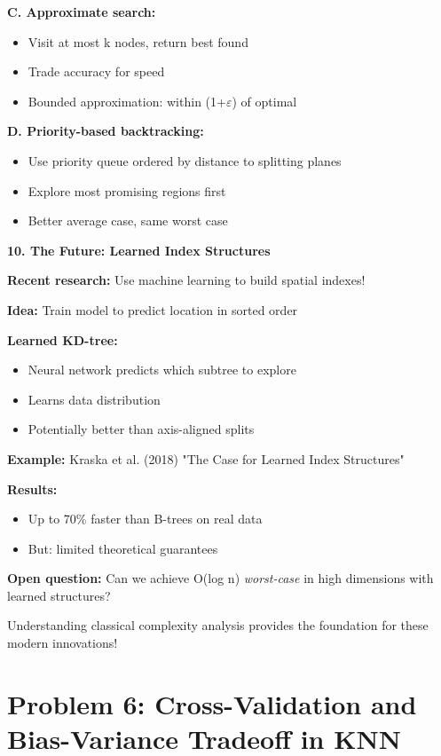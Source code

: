 \documentclass[12pt]{article}
\begin{document}
\begin{explanation}
\textbf{C. Approximate search:}
\begin{itemize}
    \item Visit at most k nodes, return best found
    \item Trade accuracy for speed
    \item Bounded approximation: within (1+$\varepsilon$) of optimal
\end{itemize}

\textbf{D. Priority-based backtracking:}
\begin{itemize}
    \item Use priority queue ordered by distance to splitting planes
    \item Explore most promising regions first
    \item Better average case, same worst case
\end{itemize}

\textbf{10. The Future: Learned Index Structures}

\textbf{Recent research:} Use machine learning to build spatial indexes!

\textbf{Idea:} Train model to predict location in sorted order

\textbf{Learned KD-tree:}
\begin{itemize}
    \item Neural network predicts which subtree to explore
    \item Learns data distribution
    \item Potentially better than axis-aligned splits
\end{itemize}

\textbf{Example:} Kraska et al. (2018) "The Case for Learned Index Structures"

\textbf{Results:}
\begin{itemize}
    \item Up to 70\% faster than B-trees on real data
    \item But: limited theoretical guarantees
\end{itemize}

\textbf{Open question:} Can we achieve O(log n) \textit{worst-case} in high dimensions with learned structures?

Understanding classical complexity analysis provides the foundation for these modern innovations!
\end{explanation}

\newpage
\section{Problem 6: Cross-Validation and Bias-Variance Tradeoff in KNN}
\end{document}
